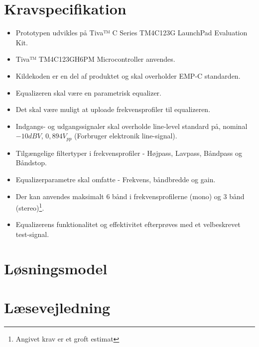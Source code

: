 \section{Kravspecifikation} \label{afs:kravspecifikation}
\begin{itemize}
	\item Prototypen udvikles på Tiva™ C Series TM4C123G LaunchPad Evaluation Kit.
	\item Tiva™ TM4C123GH6PM Microcontroller anvendes.
	\item Kildekoden er en del af produktet og skal overholder EMP-C standarden.
	\item Equalizeren skal være en parametrisk equalizer.
	\item Det skal være muligt at uploade frekvensprofiler til equalizeren.
	\item Indgangs- og udgangssignaler skal overholde line-level standard på, nominal $-10 dBV$, $0,894 V_{pp}$ (Forbruger elektronik line-signal).
	\item Tilgængelige filtertyper i frekvensprofiler - Højpass, Lavpass, Båndpass og Båndstop.
	\item Equalizerparametre skal omfatte - Frekvens, båndbredde og gain.
	\item Der kan anvendes maksimalt 6 bånd i frekvensprofilerne (mono) og 3 bånd (stereo)\footnote{Angivet krav er et groft estimat}.   
	\item Equalizerens funktionalitet og effektivitet efterprøves med et velbeskrevet test-signal.
\end{itemize}

\section{Løsningsmodel}

\section{Læsevejledning}